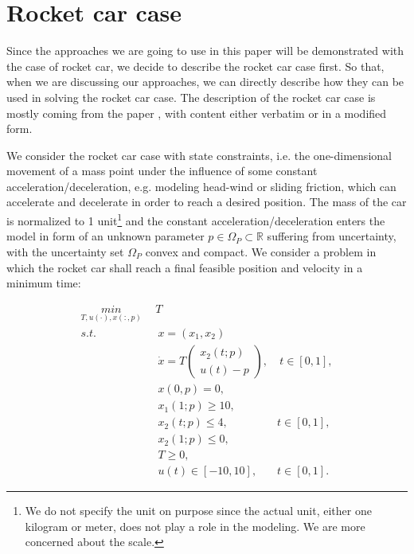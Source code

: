 



\chapter{Rocket car case}
Since the approaches we are going to use in this paper will be demonstrated with the case of rocket car, we decide to describe the rocket car case first. So that, when we are discussing our approaches, we can directly describe how they can be used in solving the rocket car case. The description of the rocket car case is mostly coming from the paper \cite{MatSch22}, with content either verbatim or in a modified form. 

We consider the rocket car case with state constraints, i.e. the one-dimensional movement of a mass point under the influence of some constant acceleration/deceleration, e.g. modeling head-wind or sliding friction, which can accelerate and decelerate in order to reach a desired position. The mass of the car is normalized to 1 unit\footnote{We do not specify the unit on purpose since the actual unit, either one kilogram or meter, does not play a role in the modeling. We are more concerned about the scale.} and the constant acceleration/deceleration enters the model in form of an unknown parameter $p \in \Omega_P \subset \mathbb{R}$ suffering from uncertainty, with the uncertainty set $\Omega_P$ convex and compact. We consider a problem in which the rocket car shall reach a final feasible position and velocity in a minimum time: 



\begin{subequations}
	\begin{align}
		\underset{T, u(\cdot), x(:,p)}{min} \   & \  T \\ 
		s.t.  & \ \ x = (x_1, x_2)   \label{rc_x} \\ 
		& \ \  \dot{x} = T  \begin{pmatrix}  x_2(t;p) \\ u(t)-p   \end{pmatrix}, & \ t \in [0,1],  \label{rc_partial} \\
		& \ \ x(0,p) = 0, \label{rc_t0}\\
		& \ \ x_1(1;p) \geq 10, \label{rc_x1_t1} \\
		& \ \ x_2(t;p) \leq 4, & t \in [0,1], \label{rc_x2_tc} \\
		& \ \ x_2(1;p) \leq 0, \label{rc_x2_t1}  \\
		& \ \ T \geq 0, \\
		& \ \ u(t) \in [-10, 10], & t \in [0,1]. 
	\end{align}
	\label{rc}
\end{subequations}

